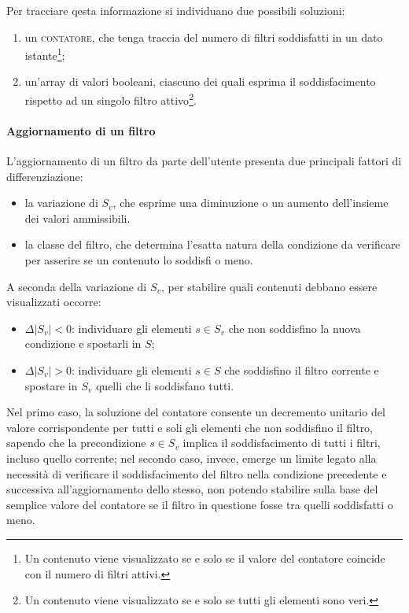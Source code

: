 Per tracciare qesta informazione si individuano due possibili soluzioni:
\begin{enumerate}
  \item un \textsc{contatore}, che tenga traccia del numero di filtri soddisfatti in un dato istante\footnote{Un contenuto viene visualizzato se e solo se il valore del contatore coincide con il numero di filtri attivi.};
  \item un'array di valori booleani, ciascuno dei quali esprima il soddisfacimento rispetto ad un singolo filtro attivo\footnote{Un contenuto viene visualizzato se e solo se tutti gli elementi sono veri.}.
\end{enumerate}

\paragraph{Aggiornamento di un filtro}
L'aggiornamento di un filtro da parte dell'utente presenta due principali fattori di differenziazione:
\begin{itemize}
\item la variazione di $S_v$, che esprime una diminuzione o un aumento dell'insieme dei valori ammissibili.
\item la classe del filtro, che determina l'esatta natura della condizione da verificare per asserire se un contenuto lo soddisfi o meno.
\end{itemize}

A seconda della variazione di $S_v$, per stabilire quali contenuti debbano essere visualizzati occorre:
\begin{itemize}
  \item $\Delta \left|S_v\right|<0$: individuare gli elementi $s \in S_v$ che non soddisfino la nuova condizione e spostarli in $S$;
  \item $\Delta \left|S_v\right|>0$: individuare gli elementi $s \in S$ che soddisfino il filtro corrente e spostare in $S_v$ quelli che li soddisfano tutti.
\end{itemize}

Nel primo caso, la soluzione del contatore consente un decremento unitario del valore corrispondente per tutti e soli gli elementi che non soddisfino il filtro, sapendo che la precondizione $s \in S_v$ implica il soddisfacimento di tutti i filtri, incluso quello corrente; nel secondo caso, invece, emerge un limite legato alla necessità di verificare il soddisfacimento del filtro nella condizione precedente e successiva all'aggiornamento dello stesso, non potendo stabilire sulla base del semplice valore del contatore se il filtro in questione fosse tra quelli soddisfatti o meno.

